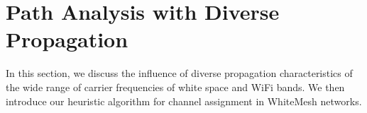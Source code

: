 \section{Path Analysis with Diverse Propagation}
\label{sec:wmalgorithms}



In this section, we discuss the influence of diverse propagation
characteristics of the wide range of carrier frequencies of
white space and WiFi bands. We then introduce our heuristic
algorithm for channel assignment in WhiteMesh networks.




